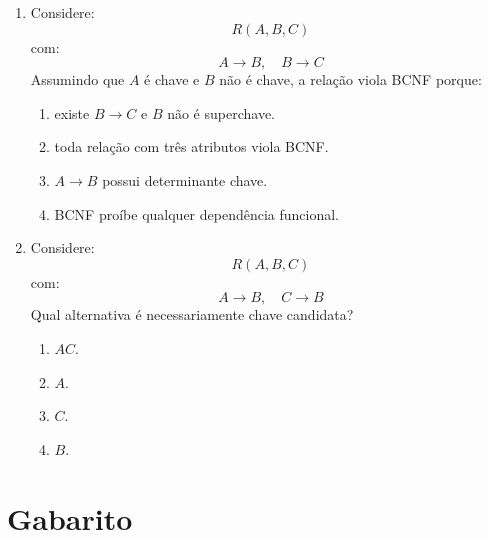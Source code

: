 \documentclass[12pt,a4paper]{article}
\begin{document}
\begin{enumerate}[resume,label=\textbf{Q\arabic*.}]
\item Considere:
\[
R(A,B,C)
\]
com:
\[
A \rightarrow B,\quad B \rightarrow C
\]
Assumindo que $A$ é chave e $B$ não é chave, a relação viola BCNF porque:

\begin{enumerate}[label=\alph*)]
    \item existe $B \rightarrow C$ e $B$ não é superchave.
    \item toda relação com três atributos viola BCNF.
    \item $A \rightarrow B$ possui determinante chave.
    \item BCNF proíbe qualquer dependência funcional.
\end{enumerate}

\item Considere:
\[
R(A,B,C)
\]
com:
\[
A \rightarrow B,\quad C \rightarrow B
\]
Qual alternativa é necessariamente chave candidata?

\begin{enumerate}[label=\alph*)]
    \item $AC$.
    \item $A$.
    \item $C$.
    \item $B$.
\end{enumerate}


\end{enumerate}

\newpage

\section*{Gabarito}
\end{document}
